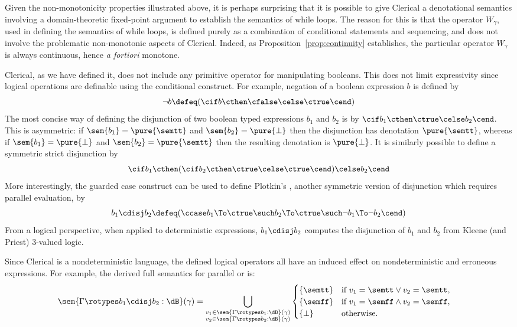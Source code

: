 Given the non-monotonicity properties illustrated above, it is perhaps surprising that it is possible to give Clerical a denotational semantics involving a domain-theoretic fixed-point argument to establish the semantics of while loops. The reason for this is that the operator $W_\gamma$, used in defining the semantics of while loops, is defined purely as a combination of conditional statements and sequencing, and does not involve the problematic non-monotonic aspects of Clerical. Indeed, as Proposition~\ref{prop:continuity} establishes,  the particular operator $W_\gamma$ is always continuous, hence \emph{a fortiori}  monotone. 

Clerical, as we have defined it, does not include any primitive operator for manipulating booleans. This does not limit expressivity since logical operations are definable using the conditional construct.
For example, negation of a boolean expression $b$ is defined by
\[
\neg b \defeq (\cif b \cthen \cfalse \celse  \ctrue  \cend)
\]
The most concise way of defining the disjunction of two boolean typed expressions $b_1$ and $b_2$ is by $\cif b_1 \cthen \ctrue \celse  b_2 \cend$. This is asymmetric: if 
$\sem{b_1} = \pure{\semtt}$ and $\sem{b_2} = \pure {\bot}$ then the disjunction has denotation $\pure{\semtt}$, whereas if
$\sem{b_1} = \pure{\bot}$ and $\sem{b_2} = \pure {\semtt}$ then 
the resulting denotation is $\pure{\bot}$. It is similarly possible to define a symmetric strict disjunction by 
\[\cif b_1 \cthen (\cif b_2 \cthen \ctrue \celse \ctrue \cend) \celse  b_2 \cend\]
More interestingly, the guarded case construct can be used to define Plotkin's  \cite{plotkin1977lcf}, another symmetric version of  disjunction which requires parallel evaluation, by
\begin{equation*}
b_1 \cdisj b_2 \defeq
(\ccase
      b_1 \To \ctrue
\such b_2 \To \ctrue
\such \neg b_1 \To \neg b_2
\cend)
\end{equation*}
From a logical perspective, when applied to deterministic expressions, $b_1 \cdisj b_2$ computes the disjunction of $b_1$ and $b_2$ from Kleene (and Priest) 3-valued logic.

Since Clerical is a nondeterministic language, the defined logical operators all have an induced effect on nondeterministic and erroneous expressions. For example, the derived full semantics for parallel or is:
\begin{align*}
\sem{\Gamma \rotypes b_1 \cdisj b_2 : \dB }(\gamma) &= \bigcup_{\substack{v_1 \in \sem{\Gamma \rotypes b_1:\dB}(\gamma)\\v_2 \in \sem{\Gamma \rotypes b_2 : \dB}(\gamma)}}\begin{cases}
\{\semtt\}&\text{if }v_1 = \semtt \lor v_2 = \semtt,\\
\{\semff\}&\text{if }v_1 = \semff \land v_2 = \semff,\\
\{\bot\}&\text{otherwise}.
\end{cases}
\end{align*}



